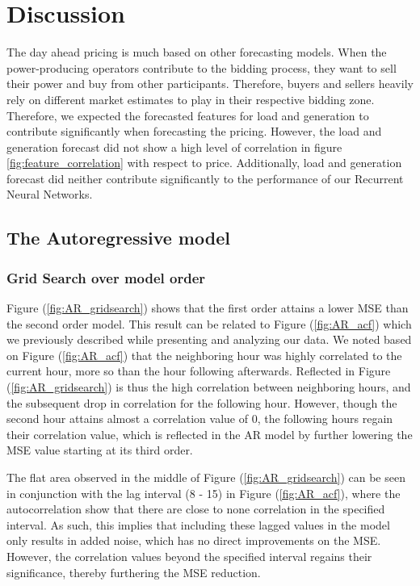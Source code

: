 \documentclass
[twocolumn,
secnumarabic,
nobibnotes,
aps,
prl,
reprint,
groupedaddress,
amsmath,
amssymb,
]{revtex4-2}
\begin{document}
\section{Discussion}
The day ahead pricing is much based on other forecasting models. When the power-producing operators contribute to the bidding process, they want to sell their power and buy from other participants. Therefore, buyers and sellers heavily rely on different market estimates to play in their respective bidding zone. Therefore, we expected the forecasted features for load and generation to contribute significantly when forecasting the pricing. However, the load and generation forecast did not show a high level of correlation in figure \ref{fig:feature_correlation} with respect to price. Additionally, load and generation forecast did neither contribute significantly to the performance of our Recurrent Neural Networks.

\subsection{The Autoregressive model}

\subsubsection{Grid Search over model order}
Figure (\ref{fig:AR_gridsearch}) shows that the first order attains a lower MSE than the second order model. This result can be related to Figure (\ref{fig:AR_acf}) which we previously described while presenting and analyzing our data. We noted based on Figure (\ref{fig:AR_acf}) that the neighboring hour was highly correlated to the current hour, more so than the hour following afterwards. Reflected in Figure (\ref{fig:AR_gridsearch}) is thus the high correlation between neighboring hours, and the subsequent drop in correlation for the following hour. However, though the second hour attains almost a correlation value of $0$, the following hours regain their correlation value, which is reflected in the AR model by further lowering the MSE value starting at its third order.

The flat area observed in the middle of Figure (\ref{fig:AR_gridsearch}) can be seen in conjunction with the lag interval (8 - 15) in Figure (\ref{fig:AR_acf}), where the autocorrelation show that there are close to none correlation in the specified interval. As such, this implies that including these lagged values in the model only results in added noise, which has no direct improvements on the MSE. However, the correlation values beyond the specified interval regains their significance, thereby furthering the MSE reduction.
\end{document}
